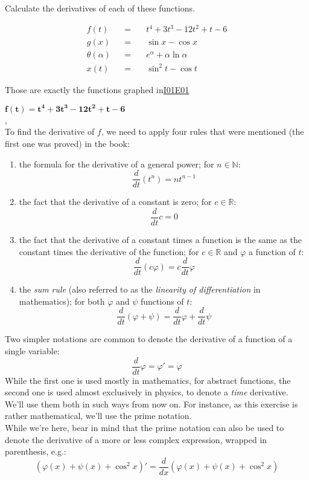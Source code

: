 \documentclass[solutions.tex]{subfiles}
\begin{document}
\maketitle
\begin{exercise}
Calculate the derivatives of each of these functions.

\begin{equation*} \begin{aligned}
	f(t) &&=\quad& t^4 + 3t^3 - 12t^2 + t - 6 \\
	g(x) &&=\quad& \sin x - \cos x \\
	\theta(\alpha) &&=\quad& e^\alpha + \alpha\ln\alpha \\
	x(t) &&=\quad& \sin^2t - \cos t
\end{aligned} \end{equation*}
\end{exercise}
\begin{remark} Those are exactly the functions graphed
in\href{https://github.com/mbivert/ttm/blob/master/cm/I01E01.pdf}{I01E01}
\end{remark}
\hr
$\bm{f(t) = t^4 + 3t^3 - 12t^2 + t - 6}$ \\, \\
To find the derivative of $f$, we need to apply four rules that
were mentioned (the first one was proved) in the book:
\begin{enumerate}
	\item the formula for the derivative of a general power;
	for $n\in\mathbb{N}$:
	\[
		\frac{d}{dt}(t^n) = n t^{n-1}
	\]
	\item the fact that the derivative of a constant is zero;
	for $c\in\mathbb{R}$:
	\[
		\frac{d}{dt}c = 0
	\]
	\item the fact that the derivative of a constant times
	a function is the same as the constant times the derivative
	of the function; for $c\in\mathbb{R}$ and $\varphi$ a function
	of $t$:
	\[
		\frac{d}{dt}(c\varphi) = c\frac{d}{dt}\varphi
	\]
	\item the \textit{sum rule} (also referred to as the
	\textit{linearity of differentiation} in mathematics); for
	both $\varphi$ and $\psi$ functions of $t$:
	\[
		\frac{d}{dt}(\varphi+\psi) = \frac{d}{dt}\varphi+\frac{d}{dt}\psi
	\]
\end{enumerate}
\begin{remark} Two simpler notations are common to denote the derivative
of a function of a single variable:
\[
	\frac{d}{dt}\varphi = \varphi' = \dot\varphi
\]
While the first one is used mostly in mathematics, for abstract functions,
the second one is used almost exclusively in physics, to denote
a \textit{time} derivative. We'll use them both in such ways from
now on. For instance, as this exercise is rather mathematical, we'll
use the prime notation. \\

While we're here, bear in mind that the prime notation can also be used
to denote the derivative of a more or less complex expression, wrapped
in parenthesis, e.g.:
\[
	(\varphi(x)+\psi(x)+\cos^2 x)' = \frac{d}{dx}(\varphi(x)+\psi(x)+\cos^2 x)
\]
\end{remark}
\end{document}
